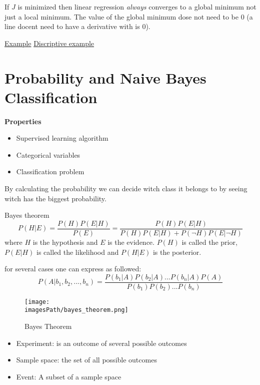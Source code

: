 \documentclass{article}
\newcommand{\imagesPath}{images}
\begin{document}
If $J$ is minimized then linear regression \textit{always} converges to a global minimum not just a local minimum.
The value of the global minimum dose not need to be $0$ (a line docent need to have a derivative with is $0$).

\href{https://www.youtube.com/watch?v=ErpIw2ohNMs}{Example}
\href{https://machinelearningmastery.com/linear-regression-tutorial-using-gradient-descent-for-machine-learning/}{Discriptive example}


\section{Probability and Naive Bayes Classification}
\textbf{Properties}
\begin{itemize}
    \item Supervised learning algorithm
    \item Categorical variables 
    \item Classification problem
\end{itemize}

By calculating the probability we can decide witch class it belongs to by seeing witch 
has the biggest probability.

\begin{definitionblock}{Bayes theorem}
    \begin{equation*}
        P(H|E) = \frac{P(H)P(E|H)}{P(E)} = \frac{P(H)P(E|H)}{P(H)P(E|H) + P(\neg H)P(E|\neg H)}
    \end{equation*}
    where $H$ is the hypothesis and $E$ is the evidence. $P(H)$ is called the prior, $P(E|H)$ is called the likelihood
    and $P(H|E)$ is the posterior.

\end{definitionblock}

for several cases one can express as followed:
\begin{equation*}
    P(A|b_1,b_2,...,b_n) = \frac{P(b_1|A)P(b_2|A)...P(b_n|A)P(A)}{P(b_1)P(b_2)...P(b_n)}
\end{equation*}

\begin{figure}[!h]
    \centering
    \texttt{[image: \\imagesPath/bayes\_theorem.png]}
    \caption{Bayes Theorem}
\end{figure}

\begin{itemize}
    \item Experiment: is an outcome of several possible outcomes
    \item Sample space: the set of all possible outcomes
    \item Event: A subset of a sample space
\end{itemize}
\end{document}
